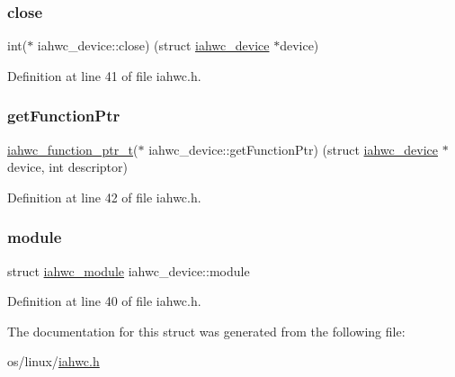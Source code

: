 \subsubsection{\texorpdfstring{close}{close}}
{\footnotesize\ttfamily int($\ast$ iahwc\+\_\+device\+::close) (struct \mbox{\hyperlink{structiahwc__device}{iahwc\+\_\+device}} $\ast$device)}



Definition at line 41 of file iahwc.\+h.

\mbox{\label{structiahwc__device_af5514f45ede1ab95ab6eafa8c3f40ad3}} 
\subsubsection{\texorpdfstring{get\+Function\+Ptr}{getFunctionPtr}}
{\footnotesize\ttfamily \mbox{\hyperlink{iahwc_8h_a214bf51cce821fdb7b24210088c12cad}{iahwc\+\_\+function\+\_\+ptr\+\_\+t}}($\ast$ iahwc\+\_\+device\+::get\+Function\+Ptr) (struct \mbox{\hyperlink{structiahwc__device}{iahwc\+\_\+device}} $\ast$device, int descriptor)}



Definition at line 42 of file iahwc.\+h.

\mbox{\label{structiahwc__device_a0aefc811fc58971ae303276df5fec646}} 
\subsubsection{\texorpdfstring{module}{module}}
{\footnotesize\ttfamily struct \mbox{\hyperlink{structiahwc__module}{iahwc\+\_\+module}} iahwc\+\_\+device\+::module}



Definition at line 40 of file iahwc.\+h.



The documentation for this struct was generated from the following file\+:\begin{DoxyCompactItemize}
\item 
os/linux/\mbox{\hyperlink{iahwc_8h}{iahwc.\+h}}\end{DoxyCompactItemize}
